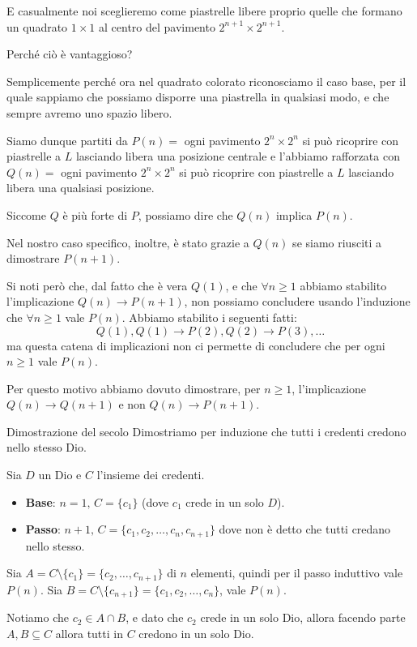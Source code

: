 \documentclass[12pt]{report}
\begin{document}
	E casualmente noi sceglieremo come piastrelle libere proprio quelle che formano un quadrato $1 \times 1$ al centro del pavimento $2^{n+1} \times 2^{n+1}$.
	
	Perché ciò è vantaggioso?
	
	Semplicemente perché ora nel quadrato colorato riconosciamo il caso base, per il quale sappiamo che possiamo disporre una piastrella in qualsiasi modo, e che sempre avremo uno spazio libero.
	
	Siamo dunque partiti da $P(n) =$ ogni pavimento $2^n \times 2^n$ si può ricoprire con piastrelle a $L$ lasciando libera una posizione centrale e l'abbiamo rafforzata con $Q(n) =$ ogni pavimento $2^n \times 2^n$ si può ricoprire con piastrelle a $L$ lasciando libera una qualsiasi posizione.
	
	Siccome $Q$ è più forte di $P$, possiamo dire che $Q(n)$ implica $P(n)$.
	
	Nel nostro caso specifico, inoltre, è stato grazie a $Q(n)$ se siamo riusciti a dimostrare $P(n+1)$.
	
	Si noti però che, dal fatto che è vera $Q(1)$, e che $\forall n \ge 1$ abbiamo stabilito l'implicazione $Q(n) \to P(n+1)$, non possiamo concludere usando l'induzione che $\forall n \ge 1$ vale $P(n)$.
	Abbiamo stabilito i seguenti fatti:
	\[
	Q(1), Q(1) \to P(2), Q(2) \to P(3), \dots
	\]
	ma questa catena di implicazioni non ci permette di concludere che per ogni $n \ge 1$ vale $P(n)$.
	
	Per questo motivo abbiamo dovuto dimostrare, per $n \ge 1$, l'implicazione $Q(n) \to Q(n+1)$ e non $Q(n) \to P(n+1)$.
	
	\begin{dimostrazione}{Dimostrazione del secolo}{}
		Dimostriamo per induzione che tutti i credenti credono nello stesso Dio.
		
		Sia $D$ un Dio e $C$ l'insieme dei credenti.
		\begin{itemize}
			\item \textbf{Base}: $n = 1,\, C = \{c_1\}$ (dove $c_1$ crede in un solo $D$).
			\item \textbf{Passo}: $n + 1,\, C = \{c_1, c_2, \dots, c_n, c_{n+1}\}$ dove non è detto che tutti credano nello stesso.
		\end{itemize}
		Sia $A = C \setminus \{c_1\} = \{c_2, \dots, c_{n+1}\}$ di $n$ elementi, quindi per il passo induttivo vale $P(n)$.
		Sia $B = C \setminus \{c_{n+1}\} = \{c_1, c_2, \dots, c_n\}$, vale $P(n)$.
		
		Notiamo che $c_2 \in A \cap B$, e dato che $c_2$ crede in un solo Dio, allora facendo parte $A, B \subseteq C$ allora tutti in $C$ credono in un solo Dio.
	\end{dimostrazione}
	
\end{document}
